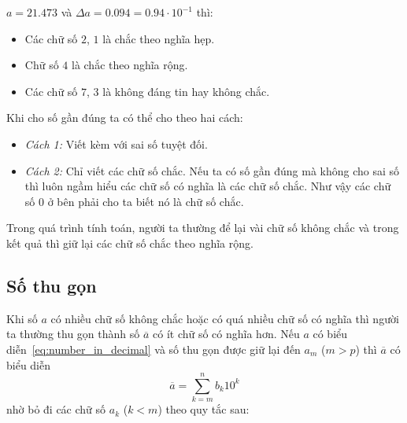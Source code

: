 \documentclass[../../Lectures.tex]{subfiles}
\begin{document}
\begin{exmp}
    \(a = \num{21.473}\) và \(\Delta a = \num{0.094} = \num{0.94} \cdot
    10^{-1}\) thì:
    \begin{itemize}
        \item Các chữ số \(2\), \(1\) là chắc theo nghĩa hẹp.
        \item Chữ số \(4\) là chắc theo nghĩa rộng.
        \item Các chữ số \(7\), \(3\) là không đáng tin hay không chắc.
    \end{itemize}
\end{exmp}

Khi cho số gần đúng ta có thể cho theo hai cách:
\begin{itemize}
    \item \emph{Cách 1:} Viết kèm với sai số tuyệt đối.
    \item \emph{Cách 2:} Chỉ viết các chữ số chắc. Nếu ta có số gần đúng mà
        không cho sai số thì luôn ngầm hiểu các chữ số có nghĩa là các chữ số
        chắc. Như vậy các chữ số 0 ở bên phải cho ta biết nó là chữ số chắc.
\end{itemize}

Trong quá trình tính toán, người ta thường để lại vài chữ số không chắc và trong
kết quả thì giữ lại các chữ số chắc theo nghĩa rộng.

\subsection{Số thu gọn}

Khi số \(a\) có nhiều chữ số không chắc hoặc có quá nhiều chữ số có nghĩa thì
người ta thường thu gọn thành số \(\overline{a}\) có ít chữ số có nghĩa hơn. Nếu
\(a\) có biểu diễn~\ref{eq:number_in_decimal} và số thu gọn được giữ lại đến
\(a_m\) (\(m > p\)) thì \(\overline{a}\) có biểu diễn
\begin{equation}
    \overline{a} = \sum_{k=m}^{n} b_k 10^k
\end{equation}
nhờ bỏ đi các chữ số \(a_k\) (\(k < m\)) theo quy tắc sau:
\end{document}
